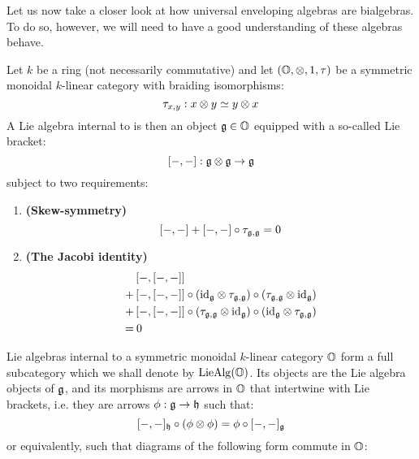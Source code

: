                 Let us now take a closer look at how universal enveloping algebras are bialgebras. To do so, however, we will need to have a good understanding of these algebras behave. 
                \begin{definition} \label{def: lie_algebras}
                    Let $k$ be a ring (not necessarily commutative) and let $(\O, \tensor, 1, \tau)$ be a symmetric monoidal $k$-linear category with braiding isomorphisms:
                        $$\tau_{x, y}: x \tensor y \cong y \tensor x$$
                    A Lie algebra internal to is then an object $\mathfrak{g} \in \mathbb{O}$ equipped with a so-called Lie bracket:
                        $$[-,-]: \g \tensor \g \to \g$$
                    subject to two requirements:
                        \begin{enumerate}
                            \item \textbf{(Skew-symmetry)}
                                $$[-,-] + [-,-] \circ \tau_{\mathfrak{g}, \mathfrak{g}} = 0$$
                            \item \textbf{(The Jacobi identity)}
                                $$
                                    \begin{aligned}
                                        & \left[-, [-,-]\right]
                                        \\
                                        + & \left[-, [-,-]\right] \circ \left(\id_{\g} \tensor \tau_{\g, \g}\right) \circ \left(\tau_{\g, \g} \tensor \id_{\g}\right)
                                        \\
                                        + & \left[-, [-,-]\right] \circ \left(\tau_{\g, \g} \tensor \id_{\g}\right) \circ \left(\id_{\g} \tensor \tau_{\g, \g}\right)
                                        \\
                                        = & \: 0
                                    \end{aligned}
                                $$
                        \end{enumerate}
                    Lie algebras internal to a symmetric monoidal $k$-linear category $\mathbb{O}$ form a full subcategory which we shall denote by $\mathrm{Lie}\mathrm{Alg}(\mathbb{O})$. Its objects are the Lie algebra objects of $\mathfrak{g}$, and its morphisms are arrows in $\mathbb{O}$ that intertwine with Lie brackets, i.e. they are arrows $\phi: \mathfrak{g} \to \mathfrak{h}$ such that:
                        $$[-,-]_{\h} \circ (\phi \tensor \phi) = \phi \circ [-,-]_{\g}$$
                    or equivalently, such that diagrams of the following form commute in $\mathbb{O}$:

\end{definition}
